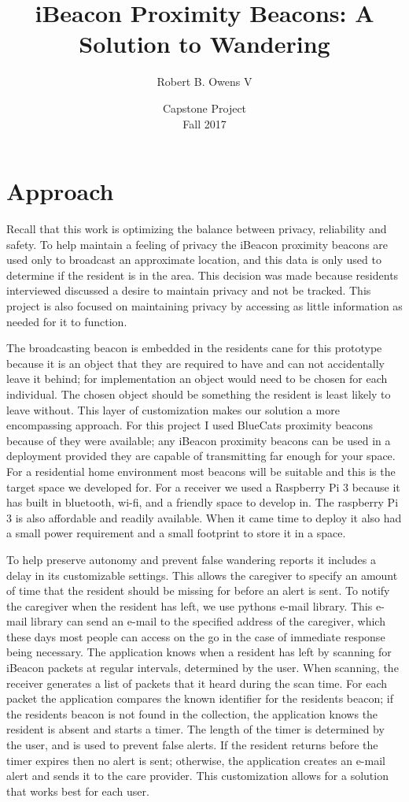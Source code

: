 \documentclass[11pt]{article}
\title{iBeacon Proximity Beacons: A Solution to Wandering}
\author{Robert B. Owens V}
\date{\small Capstone Project\\[.5em]
\small Fall 2017}
\begin{document}
\maketitle

\section{Approach}
Recall that this work is optimizing the balance between privacy, reliability and safety. To help maintain a feeling of privacy the iBeacon proximity beacons are used only to broadcast an approximate location, and this data is only used to determine if the resident is in the area. This decision was made because residents interviewed discussed a desire to maintain privacy and not be tracked\cite{robinson}. This project is also focused on maintaining privacy by accessing as little information as needed for it to function.

The broadcasting beacon is embedded in the residents cane for this prototype because it is an object that they are required to have and can not accidentally leave it behind; for implementation an object would need to be chosen for each individual. The chosen object should be something the resident is least likely to leave without. This layer of customization makes our solution a more encompassing approach. For this project I used BlueCats proximity beacons\cite{bluecats} because of they were available; any iBeacon proximity beacons can be used in a deployment provided they are capable of transmitting far enough for your space. For a residential home environment most beacons will be suitable and this is the target space we developed for. For a receiver we used a Raspberry Pi 3 because it has built in bluetooth, wi-fi, and a friendly space to develop in. The raspberry Pi 3 is also affordable and readily available. When it came time to deploy it also had a small power requirement and a small footprint to store it in a space. 

To help preserve autonomy and prevent false wandering reports it includes a delay in its customizable settings. This allows the caregiver to specify an amount of time that the resident should be missing for before an alert is sent. To notify the caregiver when the resident has left, we use pythons e-mail library. This e-mail library can send an e-mail to the specified address of the caregiver, which these days most people can access on the go in the case of immediate response being necessary. The application knows when a resident has left by scanning for iBeacon packets at regular intervals, determined by the user.  When scanning, the receiver generates a list of packets that it heard during the scan time. For each packet the application compares the known identifier for the residents beacon;  if the residents beacon is not found in the collection, the application knows the resident is absent and starts a timer. The length of the timer is determined by the user, and is used to prevent false alerts. If the resident returns before the timer expires then no alert is sent; otherwise, the application creates an e-mail alert and sends it to the care provider. This customization allows for a solution that works best for each user. 
\end{document}
